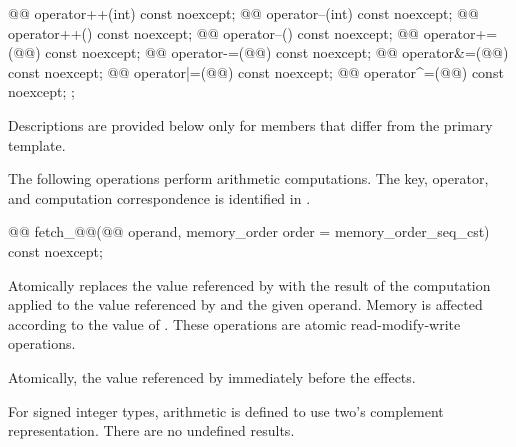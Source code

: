 \begin{codeblock}
{{    @@ operator++(int) const noexcept;
    @@ operator--(int) const noexcept;
    @@ operator++() const noexcept;
    @@ operator--() const noexcept;
    @@ operator+=(@@) const noexcept;
    @@ operator-=(@@) const noexcept;
    @@ operator&=(@@) const noexcept;
    @@ operator|=(@@) const noexcept;
    @@ operator^=(@@) const noexcept;
  };
}
\end{codeblock}

\pnum
Descriptions are provided below only for members
that differ from the primary template.

\pnum
The following operations perform arithmetic computations.
The key, operator, and computation correspondence is identified
in .

%
%
%
%
%
\begin{itemdecl}
@@ fetch_@@(@@ operand, memory_order order = memory_order_seq_cst) const noexcept;
\end{itemdecl}

\begin{itemdescr}
\pnum
\effects Atomically replaces the value referenced by  with
the result of the computation applied to the value referenced by 
and the given operand.
Memory is affected according to the value of .
These operations are atomic read-modify-write operations.

\pnum
\returns Atomically, the value referenced by 
immediately before the effects.

\pnum
{}%
\remarks For signed integer types,
arithmetic is defined to use two's complement representation.
There are no undefined results.
\end{itemdescr}

